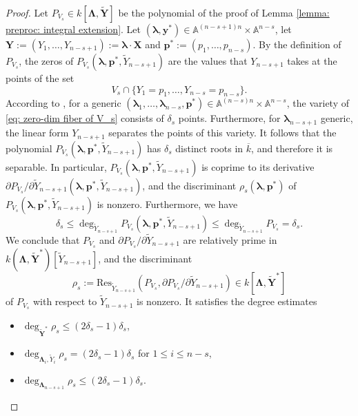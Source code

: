 \documentclass[pdflatex,sn-basic]{sn-jnl}%
\theoremstyle{thmstyleone}%
\theoremstyle{thmstyletwo}%
\theoremstyle{thmstylethree}%
\theoremstyle{definition}
\numberwithin{equation}{section}
\newcommand{\bfs}{\boldsymbol}
\newcommand{\A}{\mathbb A}
\begin{document}
\begin{proof}
Let $P_{V_s}\in k[\bfs\Lambda,\widetilde{\bfs Y}]$ be the polynomial
of the proof of Lemma \ref{lemma: preproc: integral extension}. Let
$(\bfs\lambda,\bfs y^*)\in\A^{(n-s+1)n}\times\A^{n-s}$, let $\bfs
Y:=(Y_1,\ldots,Y_{n-s+1}):=\bfs\lambda\cdot \bfs X$ and $\bfs
p^*:=(p_1,\ldots,p_{n-s})$. By the definition of $P_{V_s}$, the
zeros of $P_{V_s}(\bfs\lambda,\bfs p^*,\widetilde{Y}_{n-s+1})$ are the values
that $Y_{n-s+1}$ takes at the points of the set
%
\begin{equation}\label{eq: zero-dim fiber of V_s}
V_s\cap\{Y_1=p_1,\ldots,Y_{n-s}=p_{n-s}\}.
\end{equation}
%
According to \cite{Heintz83}, for a generic $(\bfs\lambda_1,\ldots,
\bfs\lambda_{n-s},\bfs p^*) \in\A^{(n-s)n}\times\A^{n-s}$, the
variety of \eqref{eq: zero-dim fiber of V_s} consists of $\delta_s$
points. Furthermore, for $\bfs\lambda_{n-s+1}$ generic, the linear
form $Y_{n-s+1}$ separates the points of this variety. It follows
that the polynomial $P_{V_s}(\bfs\lambda,\bfs
p^*,\widetilde{Y}_{n-s+1})$ has $\delta_s$ distinct roots in
$\overline{k}$, and therefore it is separable. In particular,
$P_{V_s}(\bfs\lambda,\bfs p^*,\widetilde{Y}_{n-s+1})$ is coprime to
its derivative $\partial P_{V_s}/\partial
\widetilde{Y}_{n-s+1}(\bfs\lambda,\bfs p^*,\widetilde{Y}_{n-s+1})$,
and the discriminant $\rho_s(\bfs\lambda,\bfs p^*)$ of
$P_{V_s}(\bfs\lambda,\bfs p^*,\widetilde{Y}_{n-s+1})$ is nonzero.
Furthermore, we have
%
$$\delta_s\le \deg_{\widetilde{Y}_{n-s+1}} P_{V_s}(\bfs\lambda,\bfs
p^*,\widetilde{Y}_{n-s+1})\le\deg_{\widetilde{Y}_{n-s+1}}
P_{V_s}=\delta_s.$$
%
We conclude that %
$P_{V_s}$ and $\partial
P_{V_s}/\partial \widetilde{Y}_{n-s+1}$ are relatively prime in
$k(\bfs\Lambda,\widetilde{\bfs Y}^*) [\widetilde{Y}_{n-s+1}]$,
and the discriminant
%
\begin{equation}\label{eq:def_disc_chow}
\rho_s:=\mbox{Res}_{\widetilde{Y}_{n-s+1}}(P_{V_s},\partial P_{V_s}
/\partial \widetilde{Y}_{n-s+1})\in k[\bfs\Lambda,\widetilde{\bfs
Y}^*]\end{equation}
%
of $P_{V_s}$ with respect to $\widetilde{Y}_{n-s+1}$ is nonzero. It
satisfies the degree estimates
%
\begin{itemize}
  \item $\deg_{\widetilde{\bfs Y}^*}\rho_s\le
(2\delta_s-1)\delta_s$,
  \item $\deg_{\bfs\Lambda_i,\widetilde{Y}_i}\rho_s=
(2\delta_s-1)\delta_s$ for $1\le i\le n-s$, \item
$\deg_{\bfs\Lambda_{n-s+1}}\rho_s\le (2\delta_s-1)\delta_s$.
\end{itemize}


\end{proof}
\end{document}
